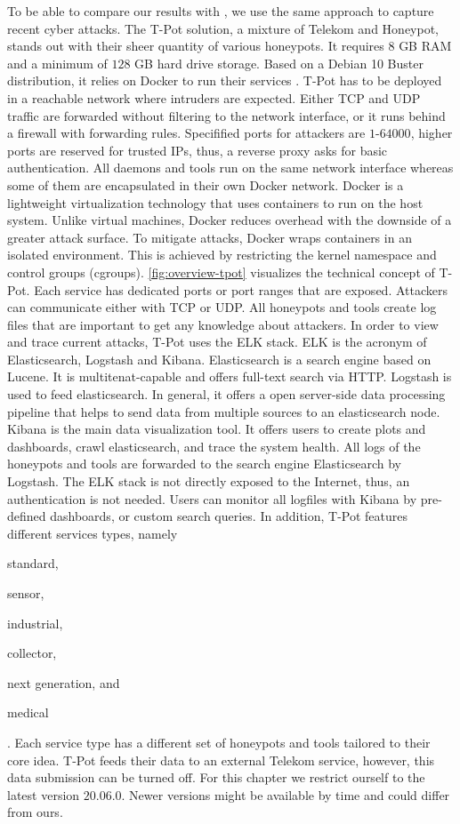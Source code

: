 To be able to compare our results with \citet{Kelly2021}, we use the same approach to capture recent cyber attacks.
The T-Pot solution, a mixture of Telekom and Honeypot, stands out with their sheer quantity of various honeypots.
It requires $8$ GB RAM and a minimum of $128$ GB hard drive storage.
Based on a Debian 10 Buster distribution, it relies on Docker to run their services \cite{combe2016}.
T-Pot has to be deployed in a reachable network where intruders are expected.
Either TCP and UDP traffic are forwarded without filtering to the network interface, or it runs behind a firewall with forwarding rules.
Specifified ports for attackers are $1$-$64000$, higher ports are reserved for trusted IPs, thus, a reverse proxy asks for basic authentication.
All daemons and tools run on the same network interface whereas some of them are encapsulated in their own Docker network.
Docker is a lightweight virtualization technology that uses containers to run on the host system.
Unlike virtual machines, Docker reduces overhead with the downside of a greater attack surface.
To mitigate attacks, Docker wraps containers in an isolated environment.
This is achieved by restricting the kernel namespace and control groups (cgroups).
\autoref{fig:overview-tpot} visualizes the technical concept of T-Pot.
Each service has dedicated ports or port ranges that are exposed.
Attackers can communicate either with TCP or UDP.
All honeypots and tools create log files that are important to get any knowledge about attackers.
In order to view and trace current attacks, T-Pot uses the ELK stack.
ELK is the acronym of Elasticsearch, Logstash and Kibana.
Elasticsearch is a search engine based on Lucene.
It is multitenat-capable and offers full-text search via HTTP.
Logstash is used to feed elasticsearch.
In general, it offers a open server-side data processing pipeline that helps to send data from multiple sources to an elasticsearch node.
Kibana is the main data visualization tool.
It offers users to create plots and dashboards, crawl elasticsearch, and trace the system health.
All logs of the honeypots and tools are forwarded to the search engine Elasticsearch by Logstash.
The ELK stack is not directly exposed to the Internet, thus, an authentication is not needed.
Users can monitor all logfiles with Kibana by pre-defined dashboards, or custom search queries.
In addition, T-Pot features different services types, namely
\begin{enumerate*}[label=(\roman*)]
    \item standard,
    \item sensor,
    \item industrial,
    \item collector,
    \item next generation, and
    \item medical
\end{enumerate*}.
Each service type has a different set of honeypots and tools tailored to their core idea.
T-Pot feeds their data to an external Telekom service, however, this data submission can be turned off.
For this chapter we restrict ourself to the latest version $20.06.0$.
Newer versions might be available by time and could differ from ours.

